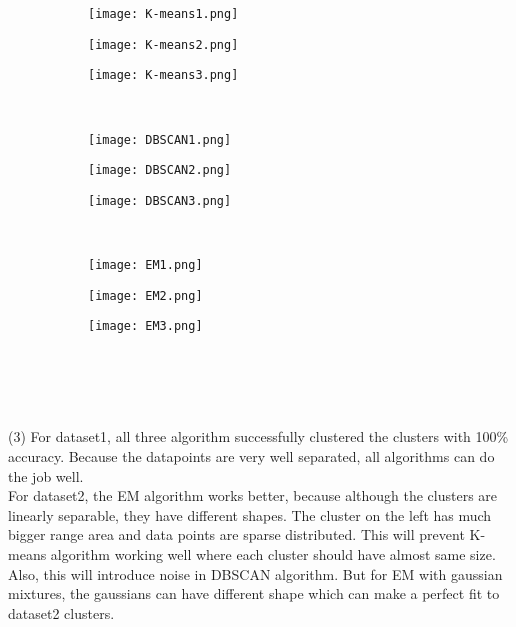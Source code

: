 \documentclass[11pt,a4paper,fleqn]{article}
\begin{document}
\begin{figure}[t!]
\begin{subfigure}{.3\textwidth}
\texttt{[image: K-means1.png]}
\end{subfigure}
\begin{subfigure}{.3\textwidth}
\texttt{[image: K-means2.png]}
\end{subfigure}
\begin{subfigure}{.3\textwidth}
\texttt{[image: K-means3.png]}
\end{subfigure}\\
\begin{subfigure}{.3\textwidth}
\texttt{[image: DBSCAN1.png]}
\end{subfigure}
\begin{subfigure}{.3\textwidth}
\texttt{[image: DBSCAN2.png]}
\end{subfigure}
\begin{subfigure}{.3\textwidth}
\texttt{[image: DBSCAN3.png]}
\end{subfigure}\\
\begin{subfigure}{.3\textwidth}
\texttt{[image: EM1.png]}
\end{subfigure}
\begin{subfigure}{.3\textwidth}
\texttt{[image: EM2.png]}
\end{subfigure}
\begin{subfigure}{.3\textwidth}
\texttt{[image: EM3.png]}
\end{subfigure}
\end{figure}\\ \\ \\ \\
(3) For dataset1, all three algorithm successfully clustered the clusters with 100\% accuracy. Because the datapoints are very well separated, all algorithms can do the job well.\\
For dataset2, the EM algorithm works better, because although the clusters are linearly separable, they have different shapes. The cluster on the left has much bigger range area and data points are sparse distributed. This will prevent K-means algorithm working well where each cluster should have almost same size. Also, this will introduce noise in DBSCAN algorithm. But for EM with gaussian mixtures, the gaussians can have different shape which can make a perfect fit to dataset2 clusters.\\
\end{document}
